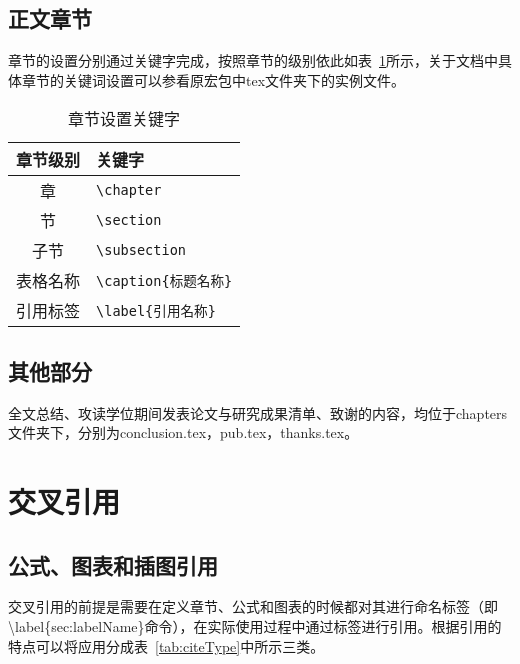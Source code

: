 \subsection{正文章节}
章节的设置分别通过关键字完成，按照章节的级别依此如表~\ref{tab:setSection}所示，关于文档中具体章节的关键词设置可以参看原宏包中tex文件夹下的实例文件。

\begin{table}[htb]
 \centering
  \caption{章节设置关键字}     %
  \label{tab:setSection}    %
  \begin{tabular}{cl}
    \hline
    章节级别        & 关键字     \\
    \hline
     章        & \verb|\chapter| \\
     节        & \verb|\section | \\
    子节      & \verb|\subsection |\\
    表格名称       & \verb|\caption{标题名称}| \\
    引用标签       & \verb|\label{引用名称}| \\
    \hline
  \end{tabular}
\end{table}

\subsection{其他部分}


全文总结、攻读学位期间发表论文与研究成果清单、致谢的内容，均位于chapters文件夹下，分别为conclusion.tex，pub.tex，thanks.tex。

\section{交叉引用}
\subsection{公式、图表和插图引用}
\label{sec:refofFigAndTab}
交叉引用的前提是需要在定义章节、公式和图表的时候都对其进行命名标签（即\textbackslash label\{sec:labelName\}命令），在实际使用过程中通过标签进行引用。根据引用的特点可以将应用分成表~\ref{tab:citeType}中所示三类。

